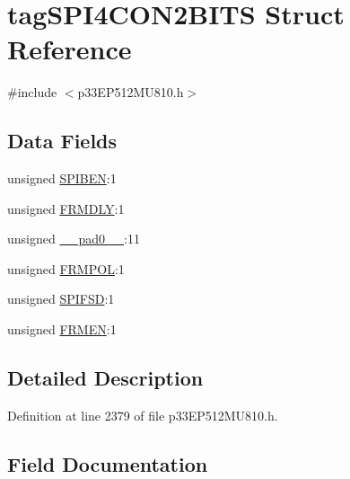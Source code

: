 \hypertarget{structtag_s_p_i4_c_o_n2_b_i_t_s}{}\section{tag\+S\+P\+I4\+C\+O\+N2\+B\+I\+TS Struct Reference}
\label{structtag_s_p_i4_c_o_n2_b_i_t_s}


{\ttfamily \#include $<$p33\+E\+P512\+M\+U810.\+h$>$}

\subsection*{Data Fields}
\begin{DoxyCompactItemize}
\item 
unsigned \hyperlink{structtag_s_p_i4_c_o_n2_b_i_t_s_a48f1b49d7589da2ee8c38cd6d820a542}{S\+P\+I\+B\+EN}\+:1
\item 
unsigned \hyperlink{structtag_s_p_i4_c_o_n2_b_i_t_s_abc2e71af924cda26b91c8945dc68c1d4}{F\+R\+M\+D\+LY}\+:1
\item 
unsigned \hyperlink{structtag_s_p_i4_c_o_n2_b_i_t_s_adf71f3d8410c1f1dbbc96680a92c49af}{\+\_\+\+\_\+pad0\+\_\+\+\_\+}\+:11
\item 
unsigned \hyperlink{structtag_s_p_i4_c_o_n2_b_i_t_s_a3f77b33ab0ae8182d247d8a75ce9795f}{F\+R\+M\+P\+OL}\+:1
\item 
unsigned \hyperlink{structtag_s_p_i4_c_o_n2_b_i_t_s_aeb3b552a9f7c25bc1ae09655904e34cc}{S\+P\+I\+F\+SD}\+:1
\item 
unsigned \hyperlink{structtag_s_p_i4_c_o_n2_b_i_t_s_a312bafba1b24944c8dfc39323e8fd4e9}{F\+R\+M\+EN}\+:1
\end{DoxyCompactItemize}


\subsection{Detailed Description}


Definition at line 2379 of file p33\+E\+P512\+M\+U810.\+h.



\subsection{Field Documentation}
\mbox{\label{structtag_s_p_i4_c_o_n2_b_i_t_s_adf71f3d8410c1f1dbbc96680a92c49af}} 
